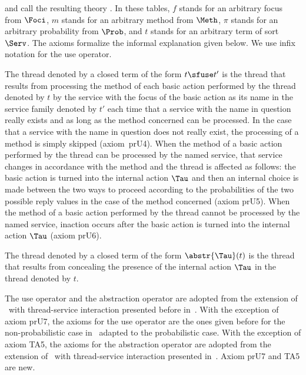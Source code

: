 \documentclass{llncs}
\begin{document}
and call the resulting theory \prTSI.
In these tables, $f$ stands for an arbitrary focus from $\Foci$, $m$ 
stands for an arbitrary method from $\Meth$, $\pi$ stands for an 
arbitrary probability from $\Prob$, and $t$ stands for an arbitrary term 
of sort $\Serv$.
The axioms formalize the informal explanation given below.
We use infix notation for the use operator.

The thread denoted by a closed term of the form $t \sfuse t'$ is the 
thread that results from processing the method of each basic action 
performed by the thread denoted by $t$ by the service with the focus of 
the basic action as its name in the service family denoted by $t'$  
each time that a service with the name in question really exists and as
long as the method concerned can be processed.
In the case that a service with the name in question does not really 
exist, the processing of a method is simply skipped (axiom~prU4).
When the method of a basic action performed by the thread can be 
processed by the named service, that service changes in accordance with 
the method and the thread is affected as follows: the basic action is 
turned into the internal action $\Tau$ and then an internal choice is 
made between the two ways to proceed according to the probabilities of 
the two possible reply values in the case of the method concerned 
(axiom prU5).
When the method of a basic action performed by the thread cannot be
processed by the named service, inaction occurs after the basic action 
is turned into the internal action $\Tau$ (axiom prU6).

The thread denoted by a closed term of the form $\abstr{\Tau}(t)$ is
the thread that results from concealing the presence of the internal 
action $\Tau$ in the thread denoted by $t$.

The use operator and the abstraction operator are adopted from the 
extension of \BTA\ with thread-service interaction presented before
in~\cite{BM12b}.
With the exception of axiom prU7, the axioms for the use operator are 
the ones given before for the non-probabilistic case in~\cite{BM12b} 
adapted to the probabilistic case.
With the exception of axiom TA5, the axioms for the abstraction operator 
are adopted from the extension of \BTA\ with thread-service interaction 
presented in~\cite{BM12b}.
Axiom prU7 and TA5 are new.
\end{document}
